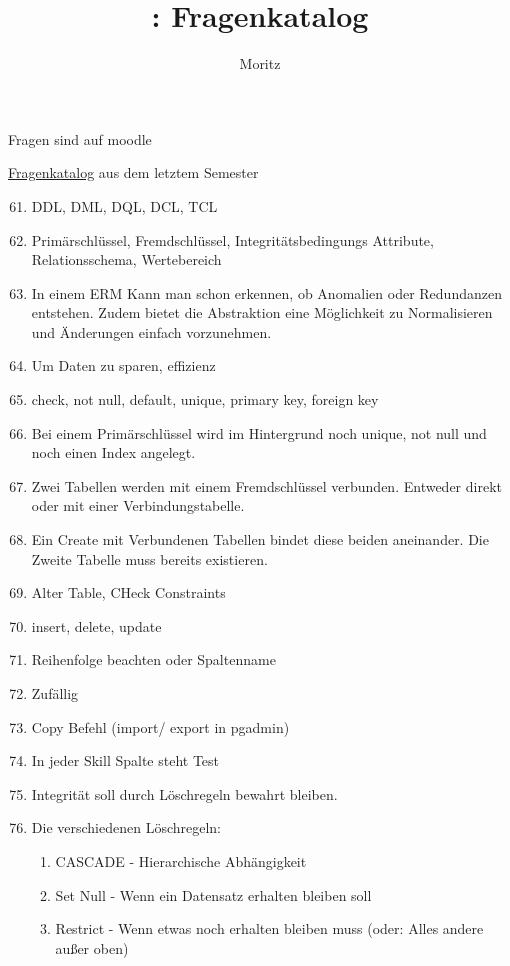 \documentclass[a4paper]{article}
\title{\docTitle : Fragenkatalog}
\author{Moritz}
\begin{document}
\maketitle

Fragen sind auf moodle

\href{../../sem3/Data/fragenkatalog.tex}{Fragenkatalog} aus dem letztem Semester

\begin{enumerate}
    \setcounter{enumi}{60}
    \item DDL, DML, DQL, DCL, TCL
    \item Primärschlüssel, Fremdschlüssel, Integritätsbedingungs Attribute, Relationsschema, Wertebereich
    \item In einem ERM Kann man schon erkennen, ob Anomalien oder Redundanzen entstehen. Zudem bietet die Abstraktion eine Möglichkeit zu Normalisieren und Änderungen einfach vorzunehmen.
    \item Um Daten zu sparen, effizienz
    \item check, not null, default, unique, primary key, foreign key
    \item Bei einem Primärschlüssel wird im Hintergrund noch unique, not null und noch einen Index angelegt.
    \item Zwei Tabellen werden mit einem Fremdschlüssel verbunden. Entweder direkt oder mit einer Verbindungstabelle.
    \item Ein Create mit Verbundenen Tabellen bindet diese beiden aneinander. Die Zweite Tabelle muss bereits existieren.
    \item Alter Table, CHeck Constraints
    \item insert, delete, update
    \item Reihenfolge beachten oder Spaltenname
    \item Zufällig
    \item Copy Befehl (import/ export in pgadmin)
    \item In jeder Skill Spalte steht Test
    \item Integrität soll durch Löschregeln bewahrt bleiben.
    \item Die verschiedenen Löschregeln:
    \begin{enumerate}
        \item CASCADE - Hierarchische Abhängigkeit
        \item Set Null - Wenn ein Datensatz erhalten bleiben soll
        \item Restrict - Wenn etwas noch erhalten bleiben muss (oder: Alles andere außer oben)

\end{enumerate}
\end{enumerate}
\end{document}

